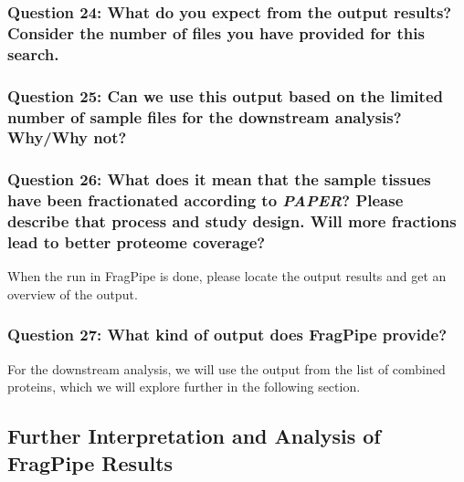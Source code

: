 \documentclass[
  letterpaper,
  DIV=11,
  numbers=noendperiod]{scrartcl}
\begin{document}
\subsubsection{Question 24: What do you expect from the output results?
Consider the number of files you have provided for this
search.}\label{question-24-what-do-you-expect-from-the-output-results-consider-the-number-of-files-you-have-provided-for-this-search.}

\subsubsection{Question 25: Can we use this output based on the limited
number of sample files for the downstream analysis? Why/Why
not?}\label{question-25-can-we-use-this-output-based-on-the-limited-number-of-sample-files-for-the-downstream-analysis-whywhy-not}

\subsubsection{\texorpdfstring{Question 26: What does it mean that the
sample tissues have been fractionated according to \emph{PAPER}? Please
describe that process and study design. Will more fractions lead to
better proteome
coverage?}{Question 26: What does it mean that the sample tissues have been fractionated according to PAPER? Please describe that process and study design. Will more fractions lead to better proteome coverage?}}\label{question-26-what-does-it-mean-that-the-sample-tissues-have-been-fractionated-according-to-paper-please-describe-that-process-and-study-design.-will-more-fractions-lead-to-better-proteome-coverage}

When the run in FragPipe is done, please locate the output results and
get an overview of the output.

\subsubsection{Question 27: What kind of output does FragPipe
provide?}\label{question-27-what-kind-of-output-does-fragpipe-provide}

For the downstream analysis, we will use the output from the list of
combined proteins, which we will explore further in the following
section.

\subsection{Further Interpretation and Analysis of FragPipe
Results}\label{further-interpretation-and-analysis-of-fragpipe-results}
\end{document}
